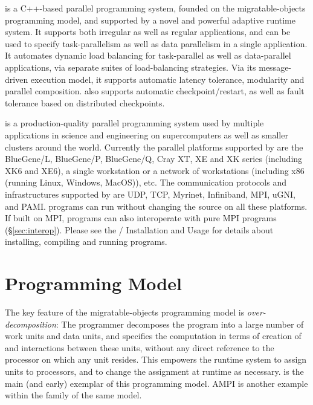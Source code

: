 
\charm is a C++-based parallel programming system, founded on the
migratable-objects programming model, and supported by a novel and
powerful adaptive runtime system. It supports both irregular as well
as regular applications, and can be used to specify task-parallelism
as well as data parallelism in a single application. It automates
dynamic load balancing for task-parallel as well as data-parallel
applications, via separate suites of load-balancing strategies. Via
its message-driven execution model, it supports automatic latency
tolerance, modularity and parallel composition. \charm also supports
automatic checkpoint/restart, as well as fault tolerance based on
distributed checkpoints.

\charm is a production-quality parallel programming system used by
multiple applications in science and engineering on supercomputers as
well as smaller clusters around the world.  Currently the parallel
platforms supported by \charm are the BlueGene/L, BlueGene/P,
BlueGene/Q, Cray XT, XE and XK series (including XK6 and XE6),
a single workstation or a network of workstations (including x86
(running Linux, Windows, MacOS)), etc.  The communication protocols
and infrastructures supported by
\charm are UDP, TCP, Myrinet, Infiniband, MPI, uGNI, and PAMI. 
\charm programs can run without changing the source
on all these platforms. If built on MPI, \charm programs can 
also interoperate with pure MPI programs (\S\ref{sec:interop}).
  Please see the \charm/\converse{}
Installation and Usage
for details about installing, compiling and running
\charm programs.


\section{Programming Model}
The key feature of the migratable-objects programming model is {\em
over-decomposition}: The programmer decomposes the program into a
large number of work units and data units, and specifies the
computation in terms of creation of and interactions between these
units, without any direct reference to the processor on which any unit
resides. This empowers the runtime system to assign units to
processors, and to change the assignment at runtime as
necessary. \charm is the main (and early) exemplar of this
programming model. AMPI is another example within the \charm family
of the same model.


